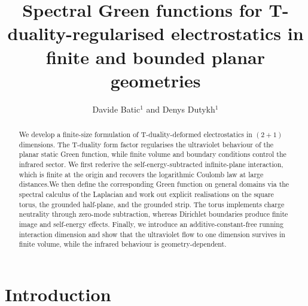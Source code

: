 \documentclass[openacc]{rsproca_new}%
\begin{document}
\title{Spectral Green functions for T-duality-regularised electrostatics in finite and bounded planar geometries}

\author{Davide Batic$^{1}$ and Denys Dutykh$^{1}$}

\address{$^{1}$Mathematics Department, Khalifa University of Science and Technology, PO Box 127788, Abu Dhabi, United Arab Emirates}

\subject{mathematical physics, electromagnetism}



\begin{abstract}
We develop a finite-size formulation of T-duality-deformed electrostatics in $(2+1)$ dimensions. The T-duality form factor regularises the ultraviolet behaviour of the planar static Green function, while finite volume and boundary conditions control the infrared sector. We first rederive the self-energy-subtracted infinite-plane interaction, which is finite at the origin and recovers the logarithmic Coulomb law at large distances.\absbreak We then define the corresponding Green function on general domains via the spectral calculus of the Laplacian and work out explicit realisations on the square torus, the grounded half-plane, and the grounded strip. The torus implements charge neutrality through zero-mode subtraction, whereas Dirichlet boundaries produce finite image and self-energy effects. Finally, we introduce an additive-constant-free running interaction dimension and show that the ultraviolet flow to one dimension survives in finite volume, while the infrared behaviour is geometry-dependent.
\end{abstract}

\rsbreak

\section{Introduction}
\end{document}
